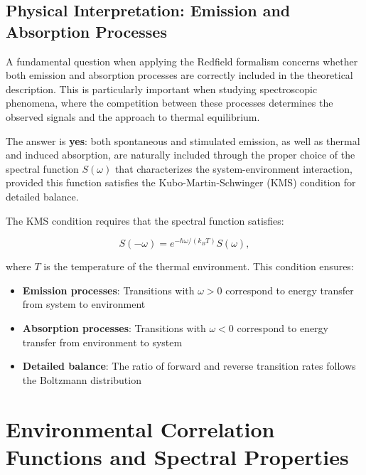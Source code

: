 \subsection{Physical Interpretation: Emission and Absorption Processes}

A fundamental question when applying the Redfield formalism concerns whether both emission and absorption processes are correctly included in the theoretical description. This is particularly important when studying spectroscopic phenomena, where the competition between these processes determines the observed signals and the approach to thermal equilibrium.

The answer is \textbf{yes}: both spontaneous and stimulated emission, as well as thermal and induced absorption, are naturally included through the proper choice of the spectral function $S(\omega)$ that characterizes the system-environment interaction, provided this function satisfies the Kubo-Martin-Schwinger (KMS) condition for detailed balance.

The KMS condition requires that the spectral function satisfies:

\begin{equation}
	S(-\omega) = e^{-\hbar\omega/(k_B T)} S(\omega),
	\label{eq:kms_condition}
\end{equation}

where $T$ is the temperature of the thermal environment. This condition ensures:

\begin{itemize}
	\item \textbf{Emission processes}: Transitions with $\omega > 0$ correspond to energy transfer from system to environment
	\item \textbf{Absorption processes}: Transitions with $\omega < 0$ correspond to energy transfer from environment to system
	\item \textbf{Detailed balance}: The ratio of forward and reverse transition rates follows the Boltzmann distribution
\end{itemize}


\section{Environmental Correlation Functions and Spectral Properties}
\label{sec:environmental_correlation_functions}

